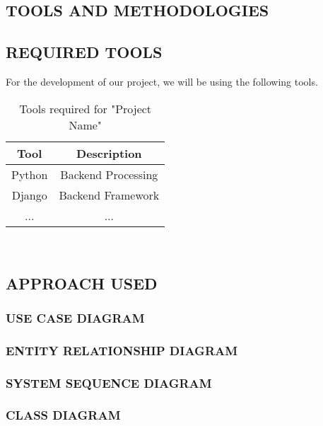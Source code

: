 \begin{center}
	\chapter{TOOLS AND METHODOLOGIES}
\end{center}
	
\section{REQUIRED TOOLS}

	For the development of our project, we will be using the following tools.\
	

\begin{table}[h!]
  \begin{center}
    \label{tab:table1}	

	\begin{tabular}{cc}
        \hline
        Tool & Description \\
        \hline
        Python &  Backend Processing \\
        Django &  Backend Framework\\
        ... &  ...\\
        \hline
    \end{tabular}
    \\[3em] %
    \caption{Tools required for "Project Name"}
  \end{center}
\end{table}

\section{APPROACH USED}
\subsection{USE CASE DIAGRAM}
\subsection{ENTITY RELATIONSHIP DIAGRAM}
\subsection{SYSTEM SEQUENCE DIAGRAM}
\subsection{CLASS DIAGRAM}